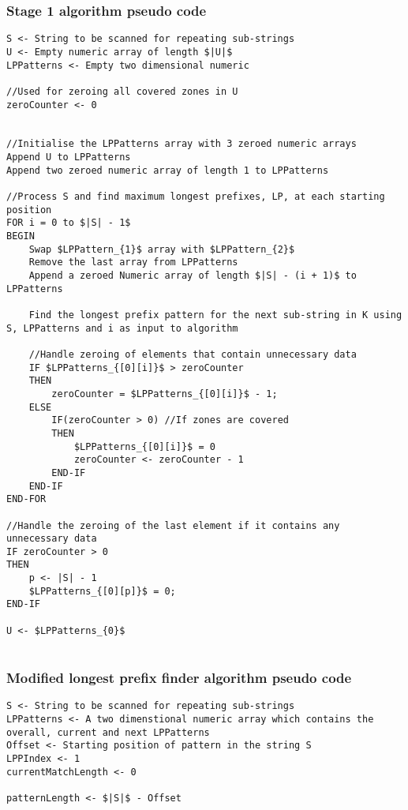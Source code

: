 \documentclass[12pt]{article}
\begin{document}
\begin{flushleft}
		\subsubsection{Stage 1 algorithm pseudo code}
\begin{lstlisting}
S <- String to be scanned for repeating sub-strings
U <- Empty numeric array of length $|U|$
LPPatterns <- Empty two dimensional numeric

//Used for zeroing all covered zones in U
zeroCounter <- 0 
 

//Initialise the LPPatterns array with 3 zeroed numeric arrays
Append U to LPPatterns 
Append two zeroed numeric array of length 1 to LPPatterns

//Process S and find maximum longest prefixes, LP, at each starting position
FOR i = 0 to $|S| - 1$
BEGIN
	Swap $LPPattern_{1}$ array with $LPPattern_{2}$
	Remove the last array from LPPatterns    
	Append a zeroed Numeric array of length $|S| - (i + 1)$ to LPPatterns
	
	Find the longest prefix pattern for the next sub-string in K using S, LPPatterns and i as input to algorithm
	
	//Handle zeroing of elements that contain unnecessary data
	IF $LPPatterns_{[0][i]}$ > zeroCounter 
	THEN
		zeroCounter = $LPPatterns_{[0][i]}$ - 1;
	ELSE 
		IF(zeroCounter > 0) //If zones are covered
		THEN
			$LPPatterns_{[0][i]}$ = 0
			zeroCounter <- zeroCounter - 1
		END-IF                   
	END-IF
END-FOR

//Handle the zeroing of the last element if it contains any unnecessary data
IF zeroCounter > 0
THEN
	p <- |S| - 1
	$LPPatterns_{[0][p]}$ = 0;
END-IF

U <- $LPPatterns_{0}$


\end{lstlisting}

\newpage
\subsubsection{Modified longest prefix finder algorithm pseudo code}

\begin{lstlisting}
S <- String to be scanned for repeating sub-strings
LPPatterns <- A two dimenstional numeric array which contains the overall, current and next LPPatterns 
Offset <- Starting position of pattern in the string S
LPPIndex <- 1 
currentMatchLength <- 0

patternLength <- $|S|$ - Offset


\end{lstlisting}
\end{flushleft}
\end{document}
